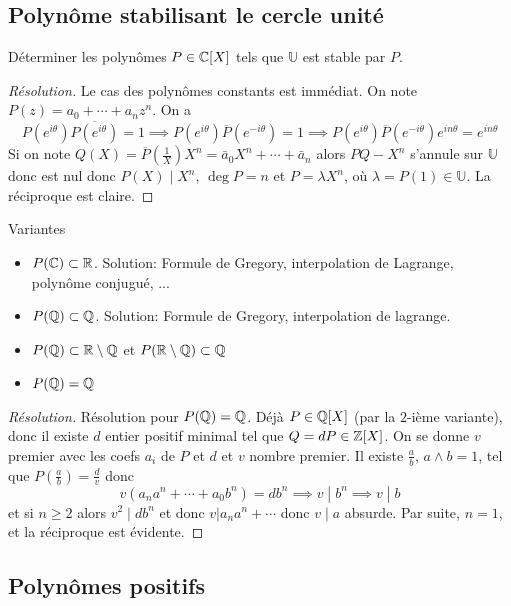 \subsection{Polynôme stabilisant le cercle unité}

\begin{exo}
    Déterminer les polynômes $P\in\mathbb C[X]$ tels que $\mathbb U$ est stable par $P$.
\end{exo}

\begin{proof}[Résolution]
    Le cas des polynômes constants est immédiat. On note $P(z)=a_0+\cdots +a_nz^n$. On a \[
        P(e^{i\theta})\overline{P(e^{i\theta})}=1\implies P(e^{i\theta})\overline P(e^{-i\theta})=1 \implies P(e^{i\theta})\overline P(e^{-i\theta})e^{in\theta}=e^{in\theta}
    \]
    Si on note $Q(X)=\overline P\left(\frac1X\right)X^n=\bar a_0X^n+\cdots +\bar a_n$ alors $PQ-X^n$ s'annule sur $\mathbb U$ donc est nul donc $P(X)\;|\;X^n$, $\deg P=n$ et $P=\lambda X^n$, où $\lambda=P(1)\in\mathbb U$. La réciproque est claire.
\end{proof}

\begin{exo}
    Variantes \begin{itemize}
        \item $P(\mathbb C)\subset \mathbb R$. Solution: Formule de Gregory, interpolation de Lagrange, polynôme conjugué, ...
        \item $P(\mathbb Q)\subset \mathbb Q$. Solution: Formule de Gregory, interpolation de lagrange.
        \item $P(\mathbb Q)\subset \mathbb R\setminus \mathbb Q$ et $P(\mathbb R\setminus \mathbb Q)\subset \mathbb Q$
        \item $P(\mathbb Q)=\mathbb Q$
    \end{itemize}
\end{exo}

\begin{proof}[Résolution]
    Résolution pour $P(\mathbb Q)=\mathbb Q$. Déjà $P\in\mathbb Q[X]$ (par la $2$-ième variante), donc il existe $d$ entier positif minimal tel que $Q=dP\in\mathbb Z[X]$. On se donne $v$ premier avec les coefs $a_i$ de $P$ et $d$ et $v$ nombre premier. Il existe $\frac ab$, $a\land b=1$, tel que $P(\frac ab)=\frac dv$ donc \[
        v(a_na^n+\cdots +a_0b^n)=db^n \implies v\;|\; b^n\implies v\;|\; b
    \]
    et si $n\geq 2$ alors $v^2\;|\;db^n$ et donc $v|a_na^n+\cdots$ donc $v\;|\;a$ absurde. Par suite, $n=1$, et la réciproque est évidente.
\end{proof}

\subsection{Polynômes positifs}

